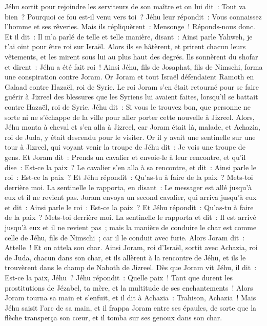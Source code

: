 \begin{multicols}{2}
Jéhu sortit pour rejoindre les serviteurs de son maître et on lui dit~: Tout va bien~? Pourquoi ce fou est-il venu vers toi~? Jéhu leur répondit~: Vous connaissez l'homme et ses rêveries.
Mais ils répliquèrent~: Mensonge~! Réponds-nous donc. Et il dit~: Il m'a parlé de telle et telle manière, disant~: Ainsi parle Yahweh, je t'ai oint pour être roi sur Israël.
Alors ils se hâtèrent, et prirent chacun leurs vêtements, et les mirent sous lui au plus haut des degrés. Ils sonnèrent du shofar et dirent~: Jéhu a été fait roi~!
Ainsi Jéhu, fils de Josaphat, fils de Nimschi, forma une conspiration contre Joram. Or Joram et tout Israël défendaient Ramoth en Galaad contre Hazaël, roi de Syrie.
Le roi Joram s'en était retourné pour se faire guérir à Jizreel des blessures que les Syriens lui avaient faites, lorsqu'il se battait contre Hazaël, roi de Syrie. Jéhu dit~: Si vous le trouvez bon, que personne ne sorte ni ne s'échappe de la ville pour aller porter cette nouvelle à Jizreel.
Alors, Jéhu monta à cheval et s'en alla à Jizreel, car Joram était là, malade, et Achazia, roi de Juda, y était descendu pour le visiter.
Or il y avait une sentinelle sur une tour à Jizreel, qui voyant venir la troupe de Jéhu dit~: Je vois une troupe de gens. Et Joram dit~: Prends un cavalier et envoie-le à leur rencontre, et qu'il dise~: Est-ce la paix~?
Le cavalier s'en alla à sa rencontre, et dit~: Ainsi parle le roi~: Est-ce la paix~? Et Jéhu répondit~: Qu'as-tu à faire de la paix~? Mets-toi derrière moi. La sentinelle le rapporta, en disant~: Le messager est allé jusqu'à eux et il ne revient pas.
Joram envoya un second cavalier, qui arriva jusqu'à eux et dit~: Ainsi parle le roi~: Est-ce la paix~? Et Jéhu répondit~: Qu'as-tu à faire de la paix~? Mets-toi derrière moi.
La sentinelle le rapporta et dit~: Il est arrivé jusqu'à eux et il ne revient pas~; mais la manière de conduire le char est comme celle de Jéhu, fils de Nimschi~; car il le conduit avec furie.
Alors Joram dit~: Attelle~! Et on attela son char. Ainsi Joram, roi d'Israël, sortit avec Achazia, roi de Juda, chacun dans son char, et ils allèrent à la rencontre de Jéhu, et ils le trouvèrent dans le champ de Naboth de Jizreel.
Dès que Joram vit Jéhu, il dit~: Est-ce la paix, Jéhu~? Jéhu répondit~: Quelle paix~! Tant que durent les prostitutions de Jézabel, ta mère, et la multitude de ses enchantements~!
Alors Joram tourna sa main et s'enfuit, et il dit à Achazia~: Trahison, Achazia~!
Mais Jéhu saisit l'arc de sa main, et il frappa Joram entre ses épaules, de sorte que la flèche transperça son cœur, et il tomba sur ses genoux dans son char.

\end{multicols}
